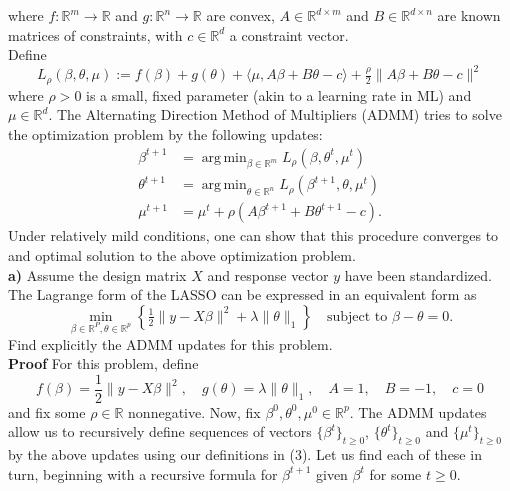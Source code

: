 \documentclass[10pt]{article}
\newcommand{\mbb}[1]{\mathbb{#1}}
\newcommand{\1}[1]{\mathbbm{1}_{#1}}
\DeclareMathOperator{\argmin}{arg\,min}
\begin{document}
    where $f:\mbb{R}^m\rightarrow\mbb{R}$ and $g:\mbb{R}^n\rightarrow\mbb{R}$ are convex, $A\in\mbb{R}^{d\times m}$ and $B\in\mbb{R}^{d\times n}$ are known matrices
    of constraints, with $c\in\mbb{R}^d$ a constraint vector.\\[5pt]
    Define
    \[L_\rho(\beta,\theta,\mu):=f(\beta)+g(\theta)+\langle\mu, A\beta+B\theta-c\rangle+\tfrac{\rho}{2}\|A\beta+B\theta-c\|^2\]
    where $\rho>0$ is a small, fixed parameter (akin to a learning rate in ML) and $\mu\in\mbb{R}^d$. The Alternating Direction Method of Multipliers (ADMM)
    tries to solve the optimization problem by the following updates:
    \begin{align*}
        \beta^{t+1}&=\argmin_{\beta\in\mbb{R}^m} L_\rho(\beta,\theta^t,\mu^t)\\
        \theta^{t+1}&=\argmin_{\theta\in\mbb{R}^n} L_\rho(\beta^{t+1},\theta,\mu^t)\\
        \mu^{t+1}&=\mu^t+\rho(A\beta^{t+1}+B\theta^{t+1}-c).
    \end{align*}
    Under relatively mild conditions, one can show that this procedure converges to and optimal solution to the above optimization problem.\\[5pt]
    {\bf a)}\hspace{5pt} Assume the design matrix $X$ and response vector $y$ have been standardized. The Lagrange form of the LASSO can be expressed in an equivalent form as
    \[\min_{\beta\in\mbb{R}^P,\theta\in\mbb{R}^p}\left\{\tfrac{1}{2}\|y-X\beta\|^2+\lambda\|\theta\|_1\right\}\quad\text{subject to $\beta-\theta=0$}.\]
    Find explicitly the ADMM updates for this problem.\\[5pt]
    {\bf Proof}\hspace{5pt} For this problem, define
    \[f(\beta)=\frac{1}{2}\|y-X\beta\|^2,\quad g(\theta)=\lambda\|\theta\|_1,\quad A=1,\quad B=-1,\quad c=0\tag{3}\]
    and fix some $\rho\in\mbb{R}$ nonnegative. Now, fix $\beta^0,\theta^0,\mu^0\in\mbb{R}^p$. The ADMM updates allow us to recursively
    define sequences of vectors $\{\beta^t\}_{t\geq 0}$, $\{\theta^t\}_{t\geq 0}$ and $\{\mu^t\}_{t\geq 0}$ by the above updates using our definitions in (3).
    Let us find each of these in turn, beginning with a recursive formula for $\beta^{t+1}$ given $\beta^t$ for some $t\geq 0$.
\end{document}
